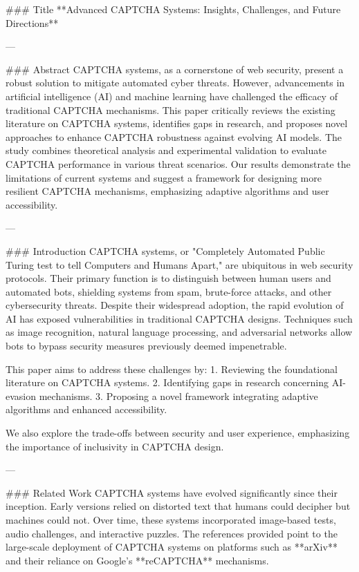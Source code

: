 ### Title
**Advanced CAPTCHA Systems: Insights, Challenges, and Future Directions**

---

### Abstract
CAPTCHA systems, as a cornerstone of web security, present a robust solution to mitigate automated cyber threats. However, advancements in artificial intelligence (AI) and machine learning have challenged the efficacy of traditional CAPTCHA mechanisms. This paper critically reviews the existing literature on CAPTCHA systems, identifies gaps in research, and proposes novel approaches to enhance CAPTCHA robustness against evolving AI models. The study combines theoretical analysis and experimental validation to evaluate CAPTCHA performance in various threat scenarios. Our results demonstrate the limitations of current systems and suggest a framework for designing more resilient CAPTCHA mechanisms, emphasizing adaptive algorithms and user accessibility.

---

### Introduction
CAPTCHA systems, or "Completely Automated Public Turing test to tell Computers and Humans Apart," are ubiquitous in web security protocols. Their primary function is to distinguish between human users and automated bots, shielding systems from spam, brute-force attacks, and other cybersecurity threats. Despite their widespread adoption, the rapid evolution of AI has exposed vulnerabilities in traditional CAPTCHA designs. Techniques such as image recognition, natural language processing, and adversarial networks allow bots to bypass security measures previously deemed impenetrable.

This paper aims to address these challenges by:
1. Reviewing the foundational literature on CAPTCHA systems.
2. Identifying gaps in research concerning AI-evasion mechanisms.
3. Proposing a novel framework integrating adaptive algorithms and enhanced accessibility.

We also explore the trade-offs between security and user experience, emphasizing the importance of inclusivity in CAPTCHA design.

---

### Related Work
CAPTCHA systems have evolved significantly since their inception. Early versions relied on distorted text that humans could decipher but machines could not. Over time, these systems incorporated image-based tests, audio challenges, and interactive puzzles. The references provided point to the large-scale deployment of CAPTCHA systems on platforms such as **arXiv** and their reliance on Google's **reCAPTCHA** mechanisms.

